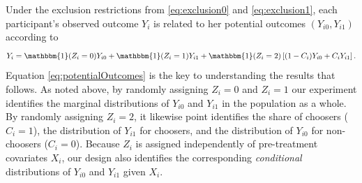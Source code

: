 \documentclass[oneside,11pt]{article}
\begin{document}
Under the exclusion restrictions from \eqref{eq:exclusion0} and \eqref{eq:exclusion1}, each participant's observed outcome $Y_i$ is related to her potential outcomes $(Y_{i0}, Y_{i1})$ according to  
\begin{equation}
    Y_i = \mathbbm{1}(Z_i =0) Y_{i0} + \mathbbm{1}(Z_i = 1)  Y_{i1}  + \mathbbm{1}(Z_i = 2) \left[(1 - C_i) Y_{i0} + C_i Y_{i1} \right].
\label{eq:potentialOutcomes}
\end{equation}
Equation \ref{eq:potentialOutcomes} is the key to understanding the results that follows. 
As noted above, by randomly assigning $Z_i=0$ and $Z_i = 1$ our experiment identifies the marginal distributions of $Y_{i0}$ and $Y_{i1}$ in the population as a whole. 
By randomly assigning $Z_i=2$, it likewise point identifies the share of choosers ($C_i = 1$), the distribution of $Y_{i1}$ for choosers, and the distribution of $Y_{i0}$ for non-choosers ($C_i = 0$).
Because $Z_i$ is assigned independently of pre-treatment covariates $X_i$, our design also identifies the corresponding \emph{conditional} distributions of $Y_{i0}$ and $Y_{i1}$ given $X_i$. 








\end{document}
